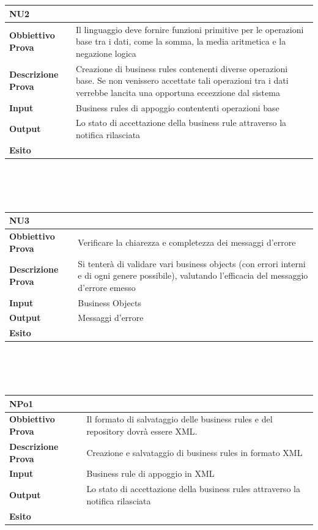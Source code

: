 \documentclass[11pt,titlepage,a4paper]{report}
\begin{document}
\\
\\
\begin{tabular}{||p{4.5cm}||p{7.5cm}||}
\hline
\textbf{\textsf{NU2}}& \\
\hline
{\textbf {Obbiettivo Prova}}& Il linguaggio deve fornire funzioni primitive per le operazioni base tra i dati, come la somma, la media aritmetica e la negazione logica \\ \hline
{\textbf{Descrizione Prova}}&  Creazione di business rules contenenti diverse operazioni base. Se non venissero accettate tali operazioni tra i dati verrebbe lancita una opportuna eccezzione dal sistema \\ \hline
{\textbf{Input}}&  Business rules di appoggio contententi operazioni base \\ \hline
{\textbf{Output}}& Lo stato di accettazione della business rule attraverso la notifica rilasciata \\ \hline
{\textbf{Esito}}&  \\ \hline
\end{tabular} \\
\\
\\
\begin{tabular}{||p{4.5cm}||p{7.5cm}||}
\hline
\textbf{\textsf{NU3}}& \\
\hline
{\textbf{Obbiettivo Prova}}& Verificare la chiarezza e completezza dei messaggi d'errore\\ \hline
{\textbf{Descrizione Prova}}& Si tenter\`a di validare vari business objects (con errori interni e di ogni genere possibile), valutando l'efficacia del messaggio d'errore emesso \\ \hline
{\textbf{Input}}&  Business Objects \\ \hline
{\textbf{Output}}& Messaggi d'errore\\ \hline
{\textbf{Esito}}&  \\ \hline
\end{tabular} \\
\\
\\
\begin{tabular}{||p{4.5cm}||p{7.5cm}||}
\hline
\textbf{\textsf{NPo1}}& \\
\hline
{\textbf{Obbiettivo Prova}}& Il formato di salvataggio delle business rules e del repository dovr\`a essere XML.\\ \hline
{\textbf{Descrizione Prova}}&  Creazione e salvataggio di business rules in formato XML  \\ \hline
{\textbf{Input}}&  Business rule di appoggio in XML \\ \hline
{\textbf{Output}}& Lo stato di accettazione della business rules attraverso la notifica rilasciata \\ \hline
{\textbf{Esito}}&  \\ \hline
\end{tabular} \\
\end{document}
